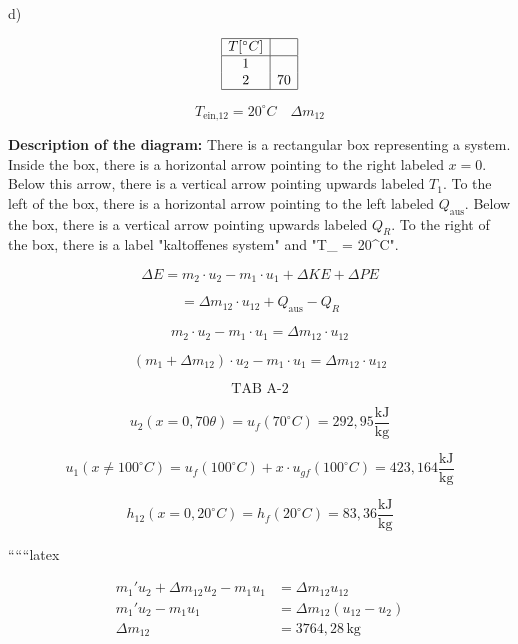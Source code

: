d)

\[
\begin{array}{|c|c|}
\hline
T [^\circ C] & \\
\hline
1 & \\
2 & 70 \\
\hline
\end{array}
\]

\[
T_{\text{ein,12}} = 20^\circ C \quad \Delta m_{12}
\]

\textbf{Description of the diagram:} There is a rectangular box representing a system. Inside the box, there is a horizontal arrow pointing to the right labeled $x=0$. Below this arrow, there is a vertical arrow pointing upwards labeled $T_1$. To the left of the box, there is a horizontal arrow pointing to the left labeled $Q_{\text{aus}}$. Below the box, there is a vertical arrow pointing upwards labeled $Q_R$. To the right of the box, there is a label "kaltoffenes system" and "T_{} = 20^\circ C".

\[
\Delta E = m_2 \cdot u_2 - m_1 \cdot u_1 + \Delta KE + \Delta PE
\]

\[
= \Delta m_{12} \cdot u_{12} + Q_{\text{aus}} - Q_R
\]

\[
m_2 \cdot u_2 - m_1 \cdot u_1 = \Delta m_{12} \cdot u_{12}
\]

\[
(m_1 + \Delta m_{12}) \cdot u_2 - m_1 \cdot u_1 = \Delta m_{12} \cdot u_{12}
\]

\[
\text{TAB A-2}
\]

\[
u_2 (x=0,70 \theta) = u_f (70^\circ C) = 292,95 \frac{\text{kJ}}{\text{kg}}
\]

\[
u_1 (x \neq 100^\circ C) = u_f (100^\circ C) + x \cdot u_{gf} (100^\circ C) = 423,164 \frac{\text{kJ}}{\text{kg}}
\]

\[
h_{12} (x=0, 20^\circ C) = h_f (20^\circ C) = 83,36 \frac{\text{kJ}}{\text{kg}}
\]

``````latex


\begin{align*}
m_1' u_2 + \Delta m_{12} u_2 - m_1 u_1 &= \Delta m_{12} u_{12} \\
m_1' u_2 - m_1 u_1 &= \Delta m_{12} (u_{12} - u_2) \\
\Delta m_{12} &= 3764,28 \, \text{kg}
\end{align*}

\noindent